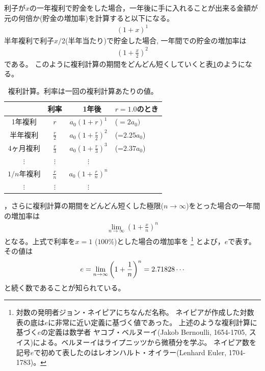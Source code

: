 \documentclass[twocolumn,11pt]{jarticle}
\begin{document}
利子が$x$の一年複利で貯金をした場合，一年後に手に入れることが出来る金額が元の何倍か(貯金の増加率)を計算すると以下になる。
\begin{align*}
  (1+x)^1
\end{align*}
半年複利で利子$x/2$(半年当たり)で貯金した場合, 一年間での貯金の増加率は
\begin{align*}
  \displaystyle \left(1+\frac{x}{2}\right)^2
\end{align*}
である。
このように複利計算の期間をどんどん短くしていくと表\ref{tab:money}のようになる。
{\small
\begin{table}[t]
  \centering
  \caption{複利計算。利率は一回の複利計算あたりの値。}
  \label{tab:money}
  \begin{tabular}[h]{|c|c|cl|}\hline
         & 利率                        &　1年後          & $r=1.0$のとき\\\hline
1年複利  & $r$                         & $a_0(1+r)^1$    & ($=2a_0)$ \\
半年複利 & $\displaystyle\frac{r}{2}$  & $\displaystyle a_0\left(1+\frac{r}{2}\right)^2$&(=$2.25a_0$)\\
4ヶ月複利& $\displaystyle\frac{r}{3}$  & $\displaystyle a_0\left(1+\frac{r}{3}\right)^3$&(=$2.37a_0$)\\
$\vdots$ & $\displaystyle\vdots$       & $\vdots$ & \\
$1/n$年複利 & $\displaystyle\frac{r}{n}$   & $\displaystyle a_0\left(1+\frac{r}{n}\right)^n$&\\
$\vdots$ & $\displaystyle\vdots$       & $\vdots$  &\\\hline
  \end{tabular}
\end{table}
}
，さらに複利計算の期間をどんどん短くした極限($n\to\infty$)をとった場合の一年間の増加率は
\begin{align}
	\label{eq:Napier-exp}
  \lim_{n\to\infty} \left( 1 + \frac{x}{n} \right)^n
  \end{align}
となる。上式で利率を$x=1$ ($100\%$)とした場合の増加率を
\footnote{対数の発明者ジョン・ネイピアにちなんだ名称。
ネイピアが作成した対数表の底は$e$に非常に近い定義に基づく値であった。
上述のような複利計算に基づく$e$の定義は数学者
{ヤコブ・ベルヌーイ}(Jakob Bernoulli, 1654-1705, スイス)による。ベルヌーイはライプニッツから微積分を学ぶ。
ネイピア数を記号$e$で初めて表したのはレオンハルト・オイラー(Lenhard Euler, 1704-1783)。
}
とよび，$e$で表す。その値は
\begin{align}
e=\lim_{n\to\infty}\left(1+\frac{1}{n}\right)^{n}=2.71828\cdots\notag  
\end{align}
と続く数であることが知られている。
\end{document}
